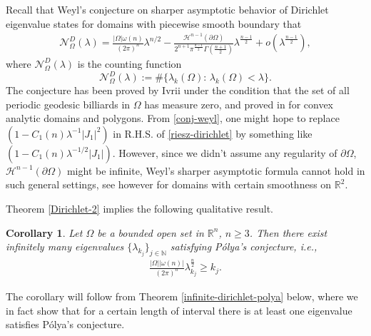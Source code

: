 \documentclass[11pt,twoside, leqno]{article}
\def\rr{{\mathbb R}}
\def\rn{{{\rr}^n}}
\newtheorem{cor}[thm]{Corollary}
\numberwithin{equation}{section}
\begin{document}
Recall that Weyl's conjecture on sharper asymptotic behavior of Dirichlet eigenvalue states for domains with piecewise smooth boundary that
\begin{align}\label{conj-weyl}
\mathcal{N}^D_{\Omega}(\lambda)=\frac{|\Omega|\omega(n)}{(2\pi)^{n}} \lambda^{n/2}-\frac{\mathcal{H}^{n-1}(\partial\Omega)}{2^{n+1} \pi^{\frac{d-1}{2}}\Gamma(\frac{n+1}{2})}\lambda^{\frac{n-1}{2}}+o(\lambda^{\frac{n-1}2}),
\end{align}
where  $\mathcal{N}^D_{\Omega}(\lambda)$ is the counting function
$$\mathcal{N}^D_{\Omega}(\lambda):=\#\{\lambda_k(\Omega):\,\lambda_k(\Omega)<\lambda\}.$$
The conjecture has been proved by Ivrii \cite{Ivr80} under the condition that the set of all periodic geodesic billiards in $\Omega$ has measure zero, and proved in \cite{SV97} for convex analytic domains
and polygons.
From \eqref{conj-weyl}, one might hope to replace $(1 -C_1(n) \lambda^{-1}|J_1|^2)$  in R.H.S. of \eqref{riesz-dirichlet}
by something like $(1 -C_1(n) \lambda^{-1/2}|J_1|)$. However, since we didn't assume any regularity of $\partial\Omega$, $\mathcal{H}^{n-1}(\partial\Omega)$
might be infinite,  Weyl's sharper asymptotic formula cannot hold in such general settings, see however \cite[Theorem 2]{KVW09}
for domains with certain smoothness on $\rr^2$.

Theorem \ref{Dirichlet-2} implies the following qualitative result.
\begin{cor}\label{cor-infinite-polya}
Let $\Omega$ be a bounded open set in $\rn$, $n\ge 3$. Then there exist infinitely many eigenvalues $\{\lambda_{k_j}\}_{j\in\mathbb{N}}$ satisfying P\'olya's conjecture, i.e.,
\begin{align}
\frac{|\Omega| |\omega(n)|}{(2\pi)^{n}}\lambda_{k_j}^{\frac n2}\ge k_j.
\end{align}
\end{cor}
The corollary will follow from Theorem \ref{infinite-dirichlet-polya} below, where we in fact show that
for a certain length of interval there is at least one eigenvalue satisfies P\'olya's conjecture.


\end{document}

